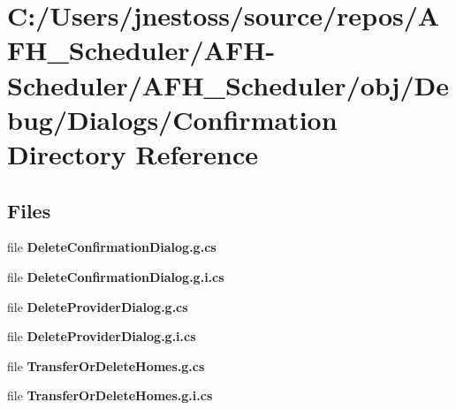 \section{C\+:/\+Users/jnestoss/source/repos/\+A\+F\+H\+\_\+\+Scheduler/\+A\+F\+H-\/\+Scheduler/\+A\+F\+H\+\_\+\+Scheduler/obj/\+Debug/\+Dialogs/\+Confirmation Directory Reference}
\label{dir_6b79564638b1c41a0ed7e3af68d04d8c}
\subsection*{Files}
\begin{DoxyCompactItemize}
\item 
file \textbf{ Delete\+Confirmation\+Dialog.\+g.\+cs}
\item 
file \textbf{ Delete\+Confirmation\+Dialog.\+g.\+i.\+cs}
\item 
file \textbf{ Delete\+Provider\+Dialog.\+g.\+cs}
\item 
file \textbf{ Delete\+Provider\+Dialog.\+g.\+i.\+cs}
\item 
file \textbf{ Transfer\+Or\+Delete\+Homes.\+g.\+cs}
\item 
file \textbf{ Transfer\+Or\+Delete\+Homes.\+g.\+i.\+cs}
\end{DoxyCompactItemize}
